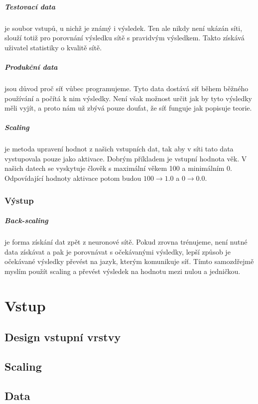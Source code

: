 \documentclass[12pt,a4paper]{report}
\begin{document}
			\paragraph{Testovací data}
			je soubor vstupů, u nichž je známý i výsledek. Ten ale nikdy není ukázán síti, slouží totiž pro porovnání výsledku sítě s pravidvým výsledkem. Takto získává uživatel statistiky o kvalitě sítě.
			\paragraph{Produkční data}
			jsou důvod proč síť vůbec programujeme. Tyto data dostává síť během běžného používání a počítá k nim výsledky. Není však možnost určit jak by tyto výsledky měli vyjít, a proto nám už zbývá pouze doufat, že síť funguje jak popisuje teorie.
		\paragraph{Scaling}
		je metoda upravení hodnot z našich vstupních dat, tak aby v síti tato data vystupovala pouze jako aktivace. Dobrým příkladem je vstupní hodnota věk. V našich datech se vyskytuje člověk s maximální věkem 100 a minimálním 0. Odpovídající hodnoty aktivace potom budou $100\rightarrow1.0$ a $0\rightarrow0.0$.
	\subsection{Výstup}
		\paragraph{Back-scaling}
		je forma získání dat zpět z neuronové sítě. Pokud zrovna trénujeme, není nutné data získávat a pak je porovnávat s očekávanými výsledky, lepší způsob je očekávané výsledky převést na jazyk, kterým komunikuje síť. Tímto samozdřejmě myslím použít scaling a převést výsledek na hodnotu mezi nulou a jedničkou.
	
\chapter{Vstup}
	\section{Design vstupní vrstvy}
	\section{Scaling}
	\section{Data}
\end{document}
